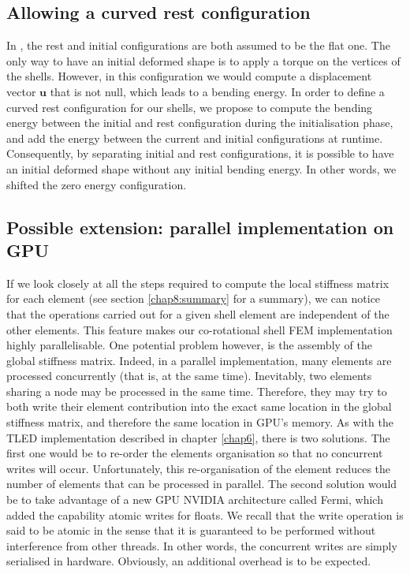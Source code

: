 \subsection{Allowing a curved rest configuration}
In \cite{Przemieniecki85}, the rest and initial configurations are both assumed to be the flat one. The only way to have an initial deformed shape is to apply a torque on the vertices of the shells. However, in this configuration we would compute a displacement vector $ \mathbf{u} $ that is not null, which leads to a bending energy. In order to define a curved rest configuration for our shells, we propose to compute the bending energy between the initial and rest configuration during the initialisation phase, and add the energy between the current and initial configurations at runtime. Consequently, by separating initial and rest configurations, it is possible to have an initial deformed shape without any initial bending energy. In other words, we shifted the zero energy configuration.


\subsection{Possible extension: parallel implementation on GPU}	\label{chap8:GPU}
If we look closely at all the steps required to compute the local stiffness matrix for each element (see section \ref{chap8:summary} for a summary), we can notice that the operations carried out for a given shell element are independent of the other elements. This feature makes our co-rotational shell FEM implementation highly parallelisable. One potential problem however, is the assembly of the global stiffness matrix. Indeed, in a parallel implementation, many elements are processed concurrently (that is, at the same time). Inevitably, two elements sharing a node may be processed in the same time. Therefore, they may try to both write their element contribution into the exact same location in the global stiffness matrix, and therefore the same location in GPU's memory. As with the TLED implementation described in chapter \ref{chap6}, there is two solutions. The first one would be to re-order the elements organisation so that no concurrent writes will occur. Unfortunately, this re-organisation of the element reduces the number of elements that can be processed in parallel. The second solution would be to take advantage of a new GPU NVIDIA architecture called Fermi, which added the capability atomic writes for floats. We recall that the write operation is said to be atomic in the sense that it is guaranteed to be performed without interference from other threads. In other words, the concurrent writes are simply serialised in hardware. Obviously, an additional overhead is to be expected. 


